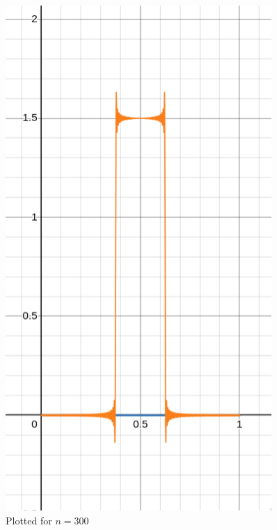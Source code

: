 \documentclass[letter]{article}
\begin{document}
\begin{minipage}{0.3\textwidth}
	\begin{figure}[H]
		\centering
		\includegraphics[width=0.9\textwidth]{ss/speed06.png}
		\caption{Plotted for $n = 300$}
		\label{fig:ss-speed03-png}
	\end{figure}
\end{minipage}
\end{document}
